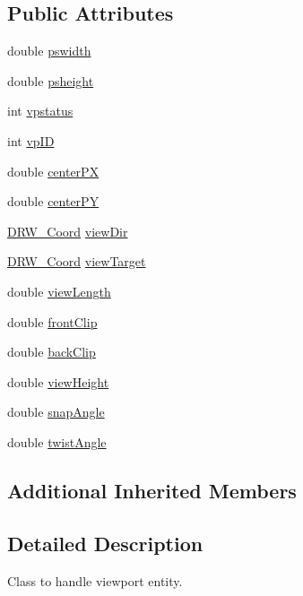 \subsection*{Public Attributes}
\begin{DoxyCompactItemize}
\item 
double \hyperlink{class_d_r_w___viewport_a3d0d03d4fc2c8a3edb3f1ad6e2cdcf2e}{pswidth}
\item 
double \hyperlink{class_d_r_w___viewport_af462ca77d7463df5319af366846b6494}{psheight}
\item 
int \hyperlink{class_d_r_w___viewport_a5d894c4b220ebb89e7b2f368a02c6a65}{vpstatus}
\item 
int \hyperlink{class_d_r_w___viewport_adbec007a8c4b56acd1a55238aca29250}{vp\+I\+D}
\item 
double \hyperlink{class_d_r_w___viewport_a345ae2f37484ce99a63b0a62444a80e9}{center\+P\+X}
\item 
double \hyperlink{class_d_r_w___viewport_aa40e5f6095ea9641c463c71f79bc7650}{center\+P\+Y}
\item 
\hyperlink{class_d_r_w___coord}{D\+R\+W\+\_\+\+Coord} \hyperlink{class_d_r_w___viewport_a7ef3ded922fc5a3c5edd5b8da8a3d3d8}{view\+Dir}
\item 
\hyperlink{class_d_r_w___coord}{D\+R\+W\+\_\+\+Coord} \hyperlink{class_d_r_w___viewport_aa33f15bb04421b33772d4ba7473a272c}{view\+Target}
\item 
double \hyperlink{class_d_r_w___viewport_a5350736f5091de23f63b13586aab6ff5}{view\+Length}
\item 
double \hyperlink{class_d_r_w___viewport_ab09b16c657b284f681b10005b7a691c6}{front\+Clip}
\item 
double \hyperlink{class_d_r_w___viewport_ac43573ecf6007bc2a5223465ab0d3dc0}{back\+Clip}
\item 
double \hyperlink{class_d_r_w___viewport_a58791e7b528bdaaa6f1ca0572c7321ea}{view\+Height}
\item 
double \hyperlink{class_d_r_w___viewport_a6ad208870366d62263d0a6ae190ab4bc}{snap\+Angle}
\item 
double \hyperlink{class_d_r_w___viewport_a0d16a6058735a91ca33cf9b19383ff69}{twist\+Angle}
\end{DoxyCompactItemize}
\subsection*{Additional Inherited Members}


\subsection{Detailed Description}
Class to handle viewport entity. 

